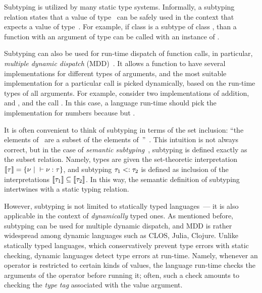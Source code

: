 Subtyping is utilized by many static type systems.
Informally, a subtyping relation  states that
a value of type~ can be safely used
in the context that expects a value of type~.
For example, if class  is a subtype of class ,
than a function with an argument of type 
can be called with an instance of . 

Subtyping can also be used for run-time dispatch of function calls, 
in particular, \emph{multiple dynamic dispatch} 
(MDD)~\cite{bib:Chambers:1992:Cecil,bib:Clifton:2000:MultiJava}.
It allows a function to have several implementations 
for different types of arguments,
and the most suitable implementation for a particular call 
is picked dynamically, based on the run-time types of all arguments.
For example, consider two implementations of addition,
 and ,
and the call .
In this case, a language run-time should pick 
the implementation for numbers 
because  but .

It is often convenient to think of subtyping 
in terms of the set inclusion: ``the elements of~ are a subset
of the elements of~''~\cite{bib:Pierce:2002:TAPL}.
This intuition is not always correct, but in the case of
\emph{semantic subtyping}~\cite{bib:Hosoya:2003:XDuce,
  bib:Frisch:2008:sem-sub, bib:Ancona:2016:sem-sub-oo}, 
subtyping is defined exactly as the subset relation. %
Namely, types are given the set-theoretic interpretation
$\llbracket \tau \rrbracket = \{\nu ~\vert~ \vdash \nu : \tau \}$, 
and subtyping $\tau_1 <: \tau_2$ is defined as inclusion 
of the interpretations
$\llbracket \tau_1 \rrbracket \subseteq \llbracket \tau_2 \rrbracket$.
In this way, the semantic definition of subtyping intertwines with 
a static typing relation.

However, subtyping is not limited to statically typed languages~---
it is also applicable in the context of \emph{dynamically} typed ones.
As mentioned before, subtyping can be used for multiple dynamic dispatch,
and MDD is rather widespread among dynamic languages
such as CLOS, Julia, Clojure.
Unlike statically typed languages, 
which conservatively prevent type errors with static checking,
dynamic languages detect type errors at run-time.
Namely, whenever an operator is restricted to certain kinds of values,
the language run-time checks the arguments of the operator before running it;
often, such a check amounts to checking the \emph{type tag} associated 
with the value argument.


